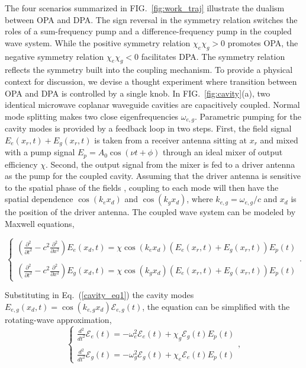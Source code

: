 \documentclass[aps,prl,nobibnotes,nofootinbib,showpacs,reprint]{revtex4-1}
\newcommand{\Fig}[1]{FIG.~\ref{#1}}
\newcommand{\Eq}[1]{Eq.~(\ref{#1})}
\newcommand{\we}{\omega_{e}}
\newcommand{\wg}{\omega_{g}}
\newcommand{\chie}{\chi_{e}}
\newcommand{\chig}{\chi_{g}}
\begin{document}
The four scenarios summarized in \Fig{fig:work_traj} illustrate the dualism between OPA and DPA. The sign reversal in the symmetry relation switches the roles of a sum-frequency pump and a difference-frequency pump in the coupled wave system. While the positive symmetry relation $\chie\chig > 0$ promotes OPA, the negative symmetry relation $\chie\chig < 0$ facilitates DPA. The symmetry relation reflects the symmetry built into the coupling mechanism. To provide a physical context for discussion, we devise a thought experiment where transition between OPA and DPA is controlled by a single knob. In \Fig{fig:cavity}(a), two identical microwave coplanar waveguide cavities are capacitively coupled. Normal mode splitting makes two close eigenfrequencies $\omega_{e,g}$. Parametric pumping for the cavity modes is provided by a feedback loop in two steps. First, the field signal $E_{e}(x_{r},t) + E_{g}(x_{r},t)$ is taken from a receiver antenna sitting at $x_{r}$ and mixed with a pump signal $E_{p} = A_{0}\cos{(\nu t + \phi)}$ through an ideal mixer of output efficiency $\chi$. Second, the output signal from the mixer is fed to a driver antenna as the pump for the coupled cavity. Assuming that the driver antenna is sensitive to the spatial phase of the fields \cite{Fink}, coupling to each mode will then have the spatial dependence $\cos{(k_{e}x_{d})}$ and $\cos{(k_{g}x_{d})}$, where $k_{e,g} = \omega_{e,g}/c$ and $x_{d}$ is the position of the driver antenna. The coupled wave system can be modeled by Maxwell equations,
\begin{widetext}
	\begin{equation}\label{cavity_eq1}
		\left\{
		\begin{array}{l}
		\displaystyle \left( \frac{\partial^2}{\partial t^2} - {c^2} \frac{\partial^2}{\partial x^2} \right) E_{e}(x_{d},t) = \chi\cos{(k_{e}x_{d})}\left( E_{e}(x_{r},t) + E_{g}(x_{r},t) \right)E_{p}(t)		\\ 	\\
		\displaystyle \left( \frac{\partial^2}{\partial t^2} - {c^2} \frac{\partial^2}{\partial x^2} \right) E_{g}(x_{d},t) = \chi\cos{(k_{g}x_{d})}\left( E_{e}(x_{r},t) + E_{g}(x_{r},t) \right)E_{p}(t)
		\end{array}	
		\right.	.
	\end{equation} 
\end{widetext}
Substituting in \Eq{cavity_eq1} the cavity modes $E_{e,g}(x_{d},t) = \cos{(k_{e,g}x_{d})}\mathcal{E}_{e,g}(t)$, the equation can be simplified with the rotating-wave approximation, 
\begin{equation}\label{cavity_eq2}
	\left\{
	\begin{array}{l}
	\displaystyle \frac{d^2}{d t^2} \mathcal{E}_{e}(t) = -\we^2 \mathcal{E}_{e}(t) + \chig\mathcal{E}_{g}(t)E_{p}(t)		\\ 	\\
	\displaystyle \frac{d^2}{d t^2} \mathcal{E}_{g}(t) = -\wg^2 \mathcal{E}_{g}(t) + \chie\mathcal{E}_{e}(t)E_{p}(t)
	\end{array}
	\right.	,
\end{equation}
\end{document}
